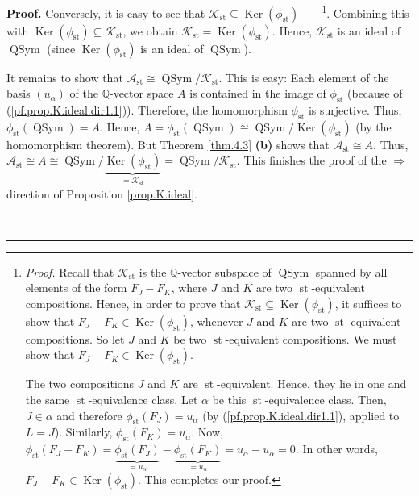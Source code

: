 \documentclass[numbers=enddot,12pt,final,onecolumn,notitlepage]{scrartcl}%
\theoremstyle{definition}
\newenvironment{proof}[1][Proof]{\noindent\textbf{#1.} }{\ \rule{0.5em}{0.5em}}
\begin{document}
\begin{proof}
Conversely, it is easy to see that $\mathcal{K}_{\operatorname*{st}}%
\subseteq\operatorname*{Ker}\left(  \phi_{\operatorname*{st}}\right)
$\ \ \ \ \footnote{\textit{Proof.} Recall that $\mathcal{K}%
_{\operatorname*{st}}$ is the $\mathbb{Q}$-vector subspace of
$\operatorname*{QSym}$ spanned by all elements of the form $F_{J}-F_{K}$,
where $J$ and $K$ are two $\operatorname*{st}$-equivalent compositions. Hence,
in order to prove that $\mathcal{K}_{\operatorname*{st}}\subseteq
\operatorname*{Ker}\left(  \phi_{\operatorname*{st}}\right)  $, it suffices to
show that $F_{J}-F_{K}\in\operatorname*{Ker}\left(  \phi_{\operatorname*{st}%
}\right)  $, whenever $J$ and $K$ are two $\operatorname*{st}$-equivalent
compositions. So let $J$ and $K$ be two $\operatorname*{st}$-equivalent
compositions. We must show that $F_{J}-F_{K}\in\operatorname*{Ker}\left(
\phi_{\operatorname*{st}}\right)  $.
\par
The two compositions $J$ and $K$ are $\operatorname*{st}$-equivalent. Hence,
they lie in one and the same $\operatorname*{st}$-equivalence class. Let
$\alpha$ be this $\operatorname*{st}$-equivalence class. Then, $J\in\alpha$
and therefore $\phi_{\operatorname*{st}}\left(  F_{J}\right)  =u_{\alpha}$ (by
(\ref{pf.prop.K.ideal.dir1.1}), applied to $L=J$). Similarly, $\phi
_{\operatorname*{st}}\left(  F_{K}\right)  =u_{\alpha}$. Now, $\phi
_{\operatorname*{st}}\left(  F_{J}-F_{K}\right)  =\underbrace{\phi
_{\operatorname*{st}}\left(  F_{J}\right)  }_{=u_{\alpha}}-\underbrace{\phi
_{\operatorname*{st}}\left(  F_{K}\right)  }_{=u_{\alpha}}=u_{\alpha
}-u_{\alpha}=0$. In other words, $F_{J}-F_{K}\in\operatorname*{Ker}\left(
\phi_{\operatorname*{st}}\right)  $. This completes our proof.}. Combining
this with $\operatorname*{Ker}\left(  \phi_{\operatorname*{st}}\right)
\subseteq\mathcal{K}_{\operatorname*{st}}$, we obtain $\mathcal{K}%
_{\operatorname*{st}}=\operatorname*{Ker}\left(  \phi_{\operatorname*{st}%
}\right)  $. Hence, $\mathcal{K}_{\operatorname*{st}}$ is an ideal of
$\operatorname*{QSym}$ (since $\operatorname*{Ker}\left(  \phi
_{\operatorname*{st}}\right)  $ is an ideal of $\operatorname*{QSym}$).

It remains to show that $\mathcal{A}_{\operatorname*{st}}\cong%
\operatorname*{QSym}/\mathcal{K}_{\operatorname*{st}}$. This is easy: Each
element of the basis $\left(  u_{\alpha}\right)  $ of the $\mathbb{Q}$-vector
space $A$ is contained in the image of $\phi_{\operatorname*{st}}$ (because of
(\ref{pf.prop.K.ideal.dir1.1})). Therefore, the homomorphism $\phi
_{\operatorname*{st}}$ is surjective. Thus, $\phi_{\operatorname*{st}}\left(
\operatorname*{QSym}\right)  =A$. Hence, $A=\phi_{\operatorname*{st}}\left(
\operatorname*{QSym}\right)  \cong\operatorname*{QSym}/\operatorname*{Ker}%
\left(  \phi_{\operatorname*{st}}\right)  $ (by the homomorphism theorem). But
Theorem \ref{thm.4.3} \textbf{(b)} shows that $\mathcal{A}_{\operatorname*{st}%
}\cong A$. Thus, $\mathcal{A}_{\operatorname*{st}}\cong A\cong%
\operatorname*{QSym}/\underbrace{\operatorname*{Ker}\left(  \phi
_{\operatorname*{st}}\right)  }_{=\mathcal{K}_{\operatorname*{st}}%
}=\operatorname*{QSym}/\mathcal{K}_{\operatorname*{st}}$. This finishes the
proof of the $\Longrightarrow$ direction of Proposition \ref{prop.K.ideal}.


\end{proof}
\end{document}
